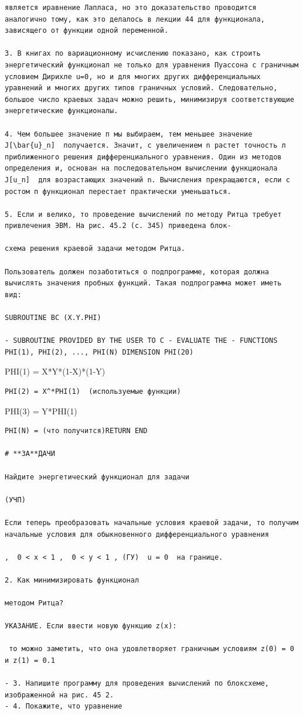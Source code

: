 \documentclass[
  ukrainian,
]{article}
\begin{document}
\begin{verbatim}
является иравнение Лапласа, но это доказательство проводится аналогично тому, как это делалось в лекции 44 для функционала, зависящего от функции одной переменной.

3. В книгах по вариационному исчислению показано, как строить энергетический функционал не только для уравнения Пуассона с граничным условием Дирихле u=0, но и для многих других дифференциальных уравнений и многих других типов граничных условий. Следовательно, большое число краевых задач можно решить, минимизируя соответствующие энергетические функционалы.

4. Чем большее значение п мы выбираем, тем меньшее значение  J[\bar{u}_n]  получается. Значит, с увеличением n растет точность л приближенного решения дифференциального уравнения. Один из методов определения и, основан на последовательном вычислении функционала  J[u_n]  для возрастающих значений n. Вычисления прекращаются, если с ростом п функционал перестает практически уменьшаться.

5. Если и велико, то проведение вычислений по методу Ритца требует привлечения ЭВМ. На рис. 45.2 (с. 345) приведена блок-

схема решения краевой задачи методом Ритца.

Пользователь должен позаботиться о подпрограмме, которая должна вычислять значения пробных функций. Такая подпрограмма может иметь вид:

SUBROUTINE BC (X.Y.PHI)

- SUBROUTINE PROVIDED BY THE USER TO C - EVALUATE THE - FUNCTIONS PHI(1), PHI(2), ..., PHI(N) DIMENSION PHI(20)
\end{verbatim}

PHI(1) = X*Y*(1-X)*(1-Y)

\begin{verbatim}
PHI(2) = X^*PHI(1)  (используемые функции)
\end{verbatim}

PHI(3) = Y*PHI(1)

\begin{verbatim}
PHI(N) = (что получится)RETURN END

# **ЗА**ДАЧИ

Найдите энергетический функционал для задачи

(УЧП) 

Если теперь преобразовать начальные условия краевой задачи, то получим начальные условия для обыкновенного дифференциального уравнения

,  0 < x < 1 ,  0 < y < 1 , (ГУ)  u = 0  на границе.

2. Как минимизировать функционал

методом Ритца?

УКАЗАНИЕ. Если ввести новую функцию z(x):

 то можно заметить, что она удовлетворяет граничным условиям z(0) = 0 и z(1) = 0.1

- 3. Напишите программу для проведения вычислений по блоксхеме, изображенной на рис. 45 2.
- 4. Покажите, что уравнение
\end{verbatim}
\end{document}
